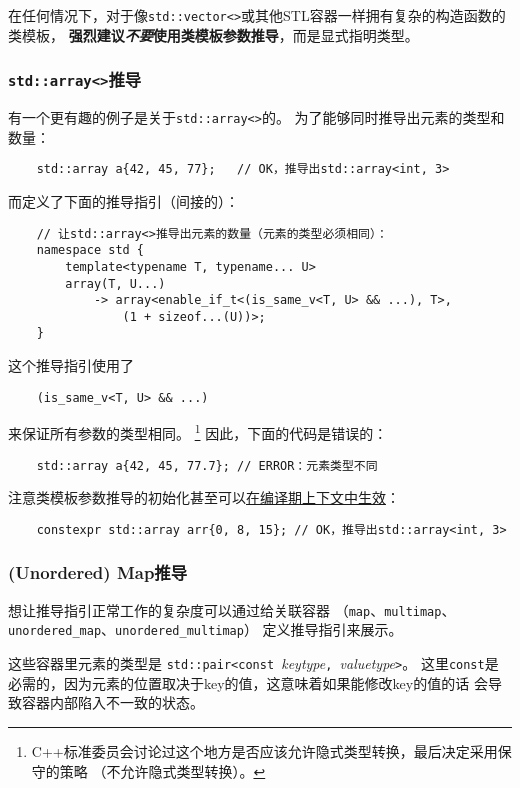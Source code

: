 在任何情况下，对于像\texttt{std::vector<>}或其他STL容器一样拥有复杂的构造函数的类模板，
\textbf{强烈建议\emph{不要}使用类模板参数推导}，而是显式指明类型。

\subsubsection*{\texttt{std::array<>}推导}\label{ch9.2.6.3}
有一个更有趣的例子是关于\texttt{std::array<>}的。
为了能够同时推导出元素的类型和数量：
\begin{lstlisting}
    std::array a{42, 45, 77};   // OK，推导出std::array<int, 3>
\end{lstlisting}
而定义了下面的推导指引（间接的）：
\begin{lstlisting}
    // 让std::array<>推导出元素的数量（元素的类型必须相同）：
    namespace std {
        template<typename T, typename... U>
        array(T, U...)
            -> array<enable_if_t<(is_same_v<T, U> && ...), T>,
                (1 + sizeof...(U))>;
    }
\end{lstlisting}
这个推导指引使用了
\begin{lstlisting}
    (is_same_v<T, U> && ...)
\end{lstlisting}
来保证所有参数的类型相同。
\footnote{C++标准委员会讨论过这个地方是否应该允许隐式类型转换，最后决定采用保守的策略
（不允许隐式类型转换）。}
因此，下面的代码是错误的：
\begin{lstlisting}
    std::array a{42, 45, 77.7}; // ERROR：元素类型不同
\end{lstlisting}
注意类模板参数推导的初始化甚至可以\hyperref[ch28.5]{在编译期上下文中生效}：
\begin{lstlisting}
    constexpr std::array arr{0, 8, 15}; // OK，推导出std::array<int, 3>
\end{lstlisting}

\subsubsection*{(Unordered) Map推导}
想让推导指引正常工作的复杂度可以通过给关联容器
（\texttt{map}、\texttt{multimap}、\texttt{unordered\_map}、\texttt{unordered\_multimap}）
定义推导指引来展示。

这些容器里元素的类型是
\texttt{std::pair<const }\emph{keytype}\texttt{, }\emph{valuetype}\texttt{>}。
这里\texttt{const}是必需的，因为元素的位置取决于key的值，这意味着如果能修改key的值的话
会导致容器内部陷入不一致的状态。

